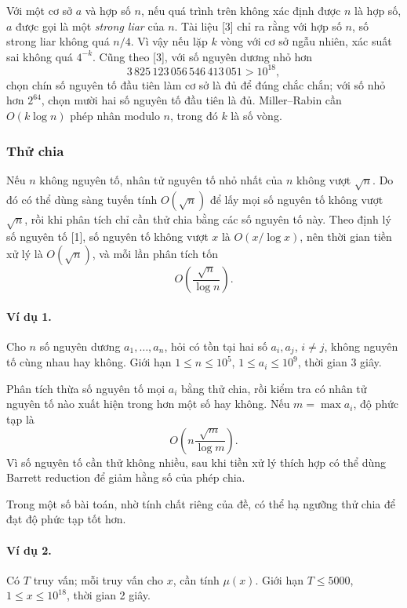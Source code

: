 \documentclass[11pt]{article}
\begin{document}
Với một cơ sở \(a\) và hợp số \(n\), nếu quá trình trên không xác định được
\(n\) là hợp số, \(a\) được gọi là một \emph{strong liar} của \(n\). Tài liệu
[3] chỉ ra rằng với hợp số \(n\), số strong liar không quá \(n/4\). Vì vậy nếu
lặp \(k\) vòng với cơ sở ngẫu nhiên, xác suất sai không quá \(4^{-k}\). Cũng
theo [3], với số nguyên dương nhỏ hơn
\[
  3\,825\,123\,056\,546\,413\,051>10^{18},
\]
chọn chín số nguyên tố đầu tiên làm cơ sở là đủ để đúng chắc chắn; với số nhỏ
hơn \(2^{64}\), chọn mười hai số nguyên tố đầu tiên là đủ. Miller--Rabin cần
\(O(k\log n)\) phép nhân modulo \(n\), trong đó \(k\) là số vòng.

\subsubsection{Thử chia}

Nếu \(n\) không nguyên tố, nhân tử nguyên tố nhỏ nhất của \(n\) không vượt
\(\sqrt n\). Do đó có thể dùng sàng tuyến tính \(O(\sqrt n)\) để lấy mọi số
nguyên tố không vượt \(\sqrt n\), rồi khi phân tích chỉ cần thử chia bằng các
số nguyên tố này. Theo định lý số nguyên tố [1], số nguyên tố không vượt \(x\)
là \(O(x/\log x)\), nên thời gian tiền xử lý là \(O(\sqrt n)\), và mỗi lần
phân tích tốn
\[
  O\left(\frac{\sqrt n}{\log n}\right).
\]

\paragraph{Ví dụ 1.}
Cho \(n\) số nguyên dương \(a_1,\ldots,a_n\), hỏi có tồn tại hai số
\(a_i,a_j\), \(i\ne j\), không nguyên tố cùng nhau hay không. Giới hạn
\(1\le n\le 10^5\), \(1\le a_i\le 10^9\), thời gian 3 giây.

Phân tích thừa số nguyên tố mọi \(a_i\) bằng thử chia, rồi kiểm tra có nhân tử
nguyên tố nào xuất hiện trong hơn một số hay không. Nếu \(m=\max a_i\), độ
phức tạp là
\[
  O\left(n\frac{\sqrt m}{\log m}\right).
\]
Vì số nguyên tố cần thử không nhiều, sau khi tiền xử lý thích hợp có thể dùng
Barrett reduction để giảm hằng số của phép chia.

Trong một số bài toán, nhờ tính chất riêng của đề, có thể hạ ngưỡng thử chia
để đạt độ phức tạp tốt hơn.

\paragraph{Ví dụ 2.}
Có \(T\) truy vấn; mỗi truy vấn cho \(x\), cần tính \(\mu(x)\). Giới hạn
\(T\le 5000\), \(1\le x\le 10^{18}\), thời gian 2 giây.
\end{document}
